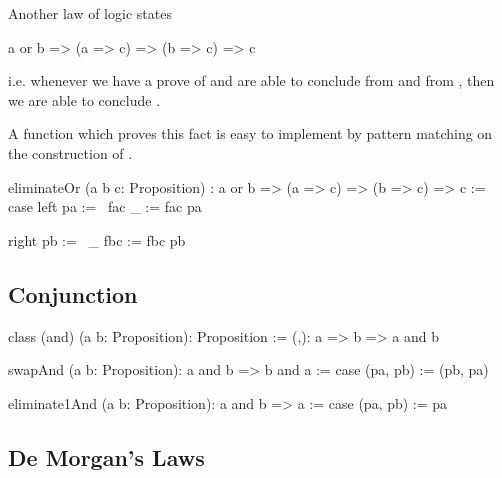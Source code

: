 \noindent Another law of logic states
\begin{alba}
  a or b  =>  (a => c) => (b => c)  =>  c
\end{alba}
%
i.e. whenever we have a prove of  and are able to conclude
 from  and  from , then we are able to
conclude .

A function which proves this fact is easy to implement by pattern matching on
the construction of .

\begin{alba}
    eliminateOr
        (a b c: Proposition)
        :   a or b
            => (a => c)
            => (b => c)
            => c
    :=
        case
            left pa :=
                \ fac _ := fac pa

            right pb :=
                \ _ fbc := fbc pb
\end{alba}










\subsection{Conjunction}

\begin{alba}
    class
        (and) (a b: Proposition): Proposition
    :=
        (,): a => b => a and b
\end{alba}


\begin{alba}
    swapAnd (a b: Proposition): a and b => b and a
    :=
        case
            (pa, pb) := (pb, pa)
\end{alba}


\begin{alba}
    eliminate1And (a b: Proposition): a and b => a :=
        case
            (pa, pb) := pa
\end{alba}








\vskip 5mm
\subsection{De Morgan's Laws}

